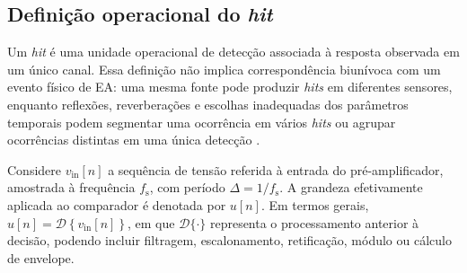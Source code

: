 
\subsection{Definição operacional do \textit{hit}}
\label{v2:subsec:formalizacao_hit}

Um \textit{hit} é uma unidade operacional de detecção associada à resposta observada em um único canal. Essa definição não implica correspondência biunívoca com um evento físico de EA: uma mesma fonte pode produzir \textit{hits} em diferentes sensores, enquanto reflexões, reverberações e escolhas inadequadas dos parâmetros temporais podem segmentar uma ocorrência em vários \textit{hits} ou agrupar ocorrências distintas em uma única detecção \cite{unnthorsson2013}.

Considere \(v_{\mathrm{in}}[n]\) a sequência de tensão referida à entrada do pré-amplificador, amostrada à frequência \(f_{\mathrm{s}}\), com período \(\Delta = 1/f_{\mathrm{s}}\). A grandeza efetivamente aplicada ao comparador é denotada por \(u[n]\). Em termos gerais, \(u[n] = \mathcal{D} \left\{v_{\mathrm{in}}[n] \right\}\), em que \(\mathcal{D}\{\cdot\}\) representa o processamento anterior à decisão, podendo incluir filtragem, escalonamento, retificação, módulo ou cálculo de envelope. 

